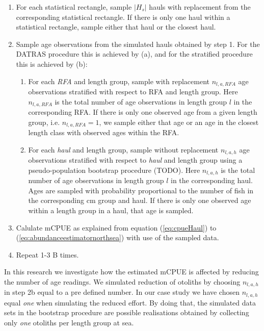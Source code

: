 \documentclass[a4paper 12pt]{article}
\numberwithin{equation}{section}
\begin{document}
\begin{enumerate}
\item For each statistical rectangle, sample $|H_s|$ hauls with replacement from the corresponding statistical rectangle. If there is only one haul within a statistical rectangle, sample either that haul or the closest haul.
\item Sample age observations from the simulated hauls obtained by step 1. For the DATRAS procedure this is achieved by (a), and for the stratified procedure this is achieved by (b):
\begin{enumerate}
\item For each \textit{RFA} and length group, sample with replacement $n_{l,a,RFA}$ age observations stratified with respect to RFA and length group. Here $n_{l,a,RFA}$ is the total number of age observations in length group $l$ in the corresponding RFA. If there is only one observed age from a given length group, i.e. $n_{l,a,RFA} = 1$, we sample either that age or an age in the closest length class with observed ages within the RFA.
\item For each \textit{haul} and length group, sample without replacement  $n_{l,a,h}$ age observations stratified with respect to \textit{haul} and length group using a pseudo-population bootstrap procedure \citep{mashreghi2016survey} (TODO). Here $n_{l,a,h}$ is the total number of age observations in length group $l$ in the corresponding haul. Ages are sampled with probability  proportional to the number of fish in the corresponding cm group and haul. If there is only one observed age within a length group in a haul, that age is sampled.
\end{enumerate}
\item Calulate mCPUE as explained from equation (\ref{eq:cpueHaul}) to (\ref{eq:abundanceestimatornorthsea}) with use of the sampled data.
\item Repeat 1-3 B times.
\end{enumerate}

In this research we investigate how the estimated mCPUE is affected by reducing the number of age readings. We simulated reduction of otoliths by choosing $n_{l,a,h}$ in step 2b equal to a pre defined number. In our case study we have chosen $n_{l,a,h}$ equal \textit{one} when simulating the reduced effort. By doing that, the simulated data sets in the bootstrap procedure are possible realisations obtained by collecting only \textit{one} otoliths per length group at sea.
\end{document}
